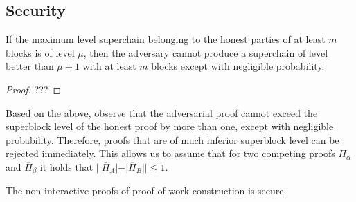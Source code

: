 \subsection{Security}

\begin{lemma}
    If the maximum level superchain belonging to the honest parties of at least
    $m$ blocks is of level $\mu$, then the adversary cannot produce a
    superchain of level better than $\mu + 1$ with at least $m$ blocks except
    with negligible probability.
\end{lemma}
\begin{proof}
    ???
\end{proof}

Based on the above, observe that the adversarial proof cannot exceed the
superblock level of the honest proof by more than one, except with negligible
probability. Therefore, proofs that are of much inferior superblock level can
be rejected immediately. This allows us to assume that for two competing proofs
$\overline{\Pi}_\alpha$ and $\overline{\Pi}_\beta$ it holds that
$||\overline{\Pi}_A| - |\overline{\Pi}_B|| \leq 1$.

\begin{theorem}
    \label{thm.security}
    The non-interactive proofs-of-proof-of-work construction is secure.
\end{theorem}

